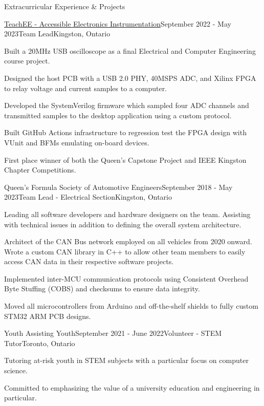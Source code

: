 \documentclass{resume} %
\begin{document}
\begin{rSection}{Extracurricular Experience \& Projects}


\begin{rSubsection}{\href{https://github.com/teachee-capstone/teachee}{TeachEE - Accessible Electronics Instrumentation}}{September 2022 - May 2023}{Team Lead}{Kingston, Ontario}
\item Built a 20MHz USB oscilloscope as a final Electrical and Computer Engineering course project.
\item Designed the host PCB with a USB 2.0 PHY, 40MSPS ADC, and Xilinx FPGA to relay voltage and current samples to a computer.
\item Developed the SystemVerilog firmware which sampled four ADC channels and transmitted samples to the desktop application using a custom protocol.
\item Built GitHub Actions infrastructure to regression test the FPGA design with VUnit and BFMs emulating on-board devices.
\item First place winner of both the Queen's Capstone Project and IEEE Kingston Chapter Competitions.
\end{rSubsection}

\newpage
\begin{rSubsection}{Queen's Formula Society of Automotive Engineers}{September 2018 - May 2023}{Team Lead - Electrical Section}{Kingston, Ontario}
\item Leading all software developers and hardware designers on the team. Assisting with technical issues in addition to defining the overall system architecture.
\item Architect of the CAN Bus network employed on all vehicles from 2020 onward. Wrote a
  custom CAN library in C++ to allow other team members to easily access CAN
  data in their respective software projects.
\item Implemented inter-MCU communication protocols using Consistent Overhead Byte Stuffing (COBS) and checksums to ensure data integrity.
\item Moved all microcontrollers from Arduino and off-the-shelf shields to fully custom STM32 ARM PCB designs.
\end{rSubsection}

\begin{rSubsection}{Youth Assisting Youth}{September 2021 - June 2022}{Volunteer - STEM Tutor}{Toronto, Ontario}
\item Tutoring at-risk youth in STEM subjects with a particular focus on computer science.
\item Committed to emphasizing the value of a university education and engineering in particular.
\end{rSubsection}


\end{rSection}
\end{document}
